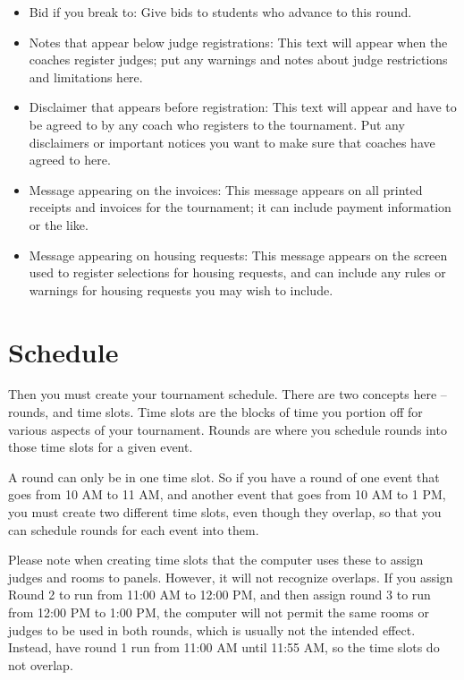 \documentclass[12pt]{report} \usepackage {fullpage} \usepackage{times}
\begin{document}
\begin{itemize}
\item Bid if you break to: 	Give bids to students who advance to this
round.

\item Notes that appear below judge registrations:  This text will appear
when the coaches register judges; put any warnings and notes about judge
restrictions and limitations here.

\item Disclaimer that appears before registration:  This text will appear
and have to be agreed to by any coach who registers to the tournament.  Put
any disclaimers or important notices you want to make sure that coaches
have agreed to here. 

\item Message appearing on the invoices:   This message appears on all
printed receipts and invoices for the tournament; it can include payment
information or the like.

\item Message appearing on housing requests: This message appears on the
screen used to register selections for housing requests, and can include
any rules or warnings for housing requests you may wish to include.

\end{itemize}

 	
\section{Schedule}

Then you must create your tournament schedule.  There are two concepts here
-- rounds, and time slots.   Time slots are the blocks of time you portion
off for various aspects of your tournament.  Rounds are where you schedule
rounds into those time slots for a given event. 

A round can only be in one time slot.  So if you have a round of one event
that goes from 10 AM to 11 AM, and another event that goes from 10 AM to 1
PM, you must create two different time slots, even though they overlap, so
that you can schedule rounds for each event into them. 

Please note when creating time slots that the computer uses these to assign
judges and rooms to panels.   However, it will not recognize overlaps.  If
you assign Round 2 to run from 11:00 AM to 12:00 PM, and then assign round
3 to run from 12:00 PM to 1:00 PM, the computer will not permit the same
rooms or judges to be used in both rounds, which is usually not the
intended effect.  Instead, have round 1 run from 11:00 AM until 11:55 AM,
so the time slots do not overlap.  
\end{document}
